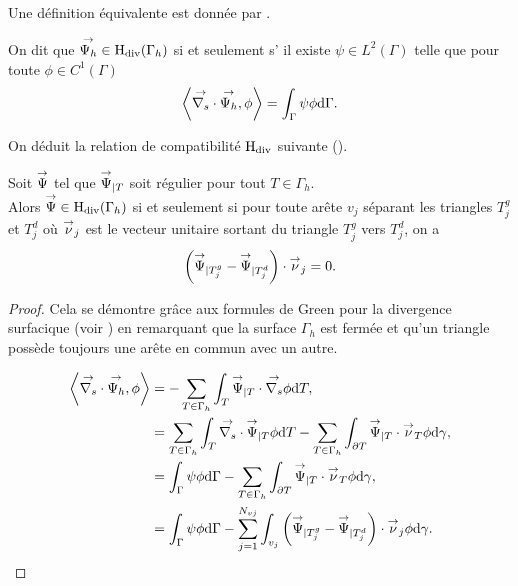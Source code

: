 Une définition équivalente est donnée par \cite[eq.~5.3]{bendali_equations_2014}.
\begin{defn}
    On dit que \({\overset{\rightarrow}{\Psi_h}} \in \mathrm{H}_\mathrm{div}(\Gamma_h)\) si et seulement s’ il existe \(\psi\in L^2(\Gamma)\) telle que pour toute \(\phi \in C^1(\Gamma)\)
    \begin{equation*}
        \left< {\overset{\rightarrow}{\nabla_s}} \cdot {\overset{\rightarrow}{\Psi_h}}, \phi \right> = \int_\Gamma \psi \phi \mathrm{d}{\Gamma}.
    \end{equation*}
\end{defn}

On déduit la relation de compatibilité \(\mathrm{H}_\mathrm{div}\) suivante (\cite[Lemme.~8]{nedelec_mixed_1980}).
\begin{prop}
    \label{prop:annex:hdiv_hrot:hdiv}
    Soit \({\overset{\rightarrow}{\Psi}}\) tel que \({\overset{\rightarrow}{\Psi}}_{|T}\) soit régulier pour tout \(T\in\Gamma_h\).\\
    Alors \({\overset{\rightarrow}{\Psi}} \in \mathrm{H}_\mathrm{div}(\Gamma_h)\) si et seulement si pour toute arête \(v_j\) séparant les triangles \(T_j^g\) et \(T_j^d\) où \({\overset{\rightarrow}{\nu}}_j\) est le vecteur unitaire sortant du triangle \(T_j^g\) vers \(T_j^d\), on a
    \begin{equation*}
        \left( {\overset{\rightarrow}{\Psi}}_{|T_j^g} - {\overset{\rightarrow}{\Psi}}_{|T_j^d} \right ) \cdot {\overset{\rightarrow}{\nu}}_j = 0.
    \end{equation*}
\end{prop}

\begin{proof}
    Cela se démontre grâce aux formules de Green pour la divergence surfacique (voir \cite[eq.~(A3.47)]{bladel_electromagnetic_2007}) en remarquant que la surface \(\Gamma_h\) est fermée et qu'un triangle possède toujours une arête en commun avec un autre.

    \begin{align*}
        \left< {\overset{\rightarrow}{\nabla_s}} \cdot {\overset{\rightarrow}{\Psi_h}}, \phi \right>
        & = - \sum_{T\in\Gamma_h} \int_T {\overset{\rightarrow}{\Psi}}_{|T} \cdot {\overset{\rightarrow}{\nabla_s}} \phi\mathrm{d}{T}, \\
        & = \sum_{T\in\Gamma_h} \int_T {\overset{\rightarrow}{\nabla_s}} \cdot {\overset{\rightarrow}{\Psi}}_{|T} \phi \mathrm{d}{T} - \sum_{T\in\Gamma_h} \int_{\partial T} {\overset{\rightarrow}{\Psi}}_{|T} \cdot {\overset{\rightarrow}{\nu}}_T \phi \mathrm{d}{\gamma}, \\
        & = \int_\Gamma \psi \phi \mathrm{d}{\Gamma} - \sum_{T\in\Gamma_h} \int_{\partial T} {\overset{\rightarrow}{\Psi}}_{|T} \cdot {\overset{\rightarrow}{\nu}}_T \phi \mathrm{d}{\gamma}, \\
        & = \int_\Gamma \psi \phi \mathrm{d}{\Gamma} - \sum_{j=1}^{N_{vj}} \int_{v_j} \left( {\overset{\rightarrow}{\Psi}}_{|T_j^g} - {\overset{\rightarrow}{\Psi}}_{|T_j^d} \right) \cdot {\overset{\rightarrow}{\nu}}_j \phi \mathrm{d}{\gamma}.
    \end{align*}
\end{proof}


